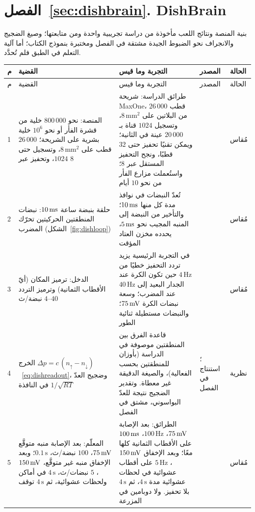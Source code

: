 \section{الفصل~\ref{sec:dishbrain}. \foreignlanguage{english}{DishBrain}}

بنية المنصة ونتائج اللعب مأخوذة من دراسة تجريبية واحدة ومن متابعتها؛ وصيغ الضجيج والانجراف نحو الضبوط الجيدة مشتقة في الفصل ومختبرة بنموذج الكتاب؛ أما آلية التعلم في الطبق فلم تُحدَّد.

{\footnotesize
\setlength{\tabcolsep}{3pt}\renewcommand{\arraystretch}{1.15}
\begin{longtable}{>{\raggedright}p{0.5cm}>{\raggedright}p{4.0cm}>{\raggedright}p{5.6cm}>{\raggedright}p{2.3cm}>{\raggedright\arraybackslash}p{1.7cm}}
\toprule
م & القضية & التجربة وما قيس & المصدر & الحالة \\
\midrule\endfirsthead
\toprule
م & القضية & التجربة وما قيس & المصدر & الحالة \\
\midrule\endhead
1 & المنصة: نحو $800\,000$ خلية من قشرة الفأر أو نحو $10^6$ خلية بشرية على الشريحة؛ $26\,000$ قطب على $8\,\text{mm}^2$، وتسجيل حتى $1024$، وتحفيز عبر $8$ & طرائق الدراسة: شريحة \foreignlanguage{english}{MaxOne}، $26\,000$ قطب من البلاتين على $8\,\text{mm}^2$، وتسجيل $1024$ قناة بـ$20\,000$ عينة في الثانية؛ ويمكن تقنيًا تحفيز حتى $32$ قطبًا، ونجح التحفيز المستقل عبر $8$؛ واستُعملت مزارع الفأر من نحو $10$ أيام & \cite{Kagan2022} & مُقاس \\
2 & حلقة بنبضة ساعة $10\,\text{ms}$: نبضات المنطقتين الحركيتين تحرّك المضرب (الشكل~\ref{fig:dishloop}) & تُعدّ النبضات في نوافذ مدة كل منها $10\,\text{ms}$؛ والتأخير من النبضة إلى المنبه المجيب نحو $5\,\text{ms}$، يحدده مخزن العتاد المؤقت & \cite{Kagan2022} & مُقاس \\
3 & الدخل: ترميز المكان (أيّ الأقطاب الثمانية) وترميز التردد $4\text{--}40$ نبضة/ث & في التجربة الرئيسية يزيد تردد التحفيز خطيًا من $4\,\text{Hz}$ حين تكون الكرة عند الجدار البعيد إلى $40\,\text{Hz}$ عند المضرب؛ وسعة نبضات الكرة $75\,\text{mV}$؛ والنبضات مستطيلة ثنائية الطور & \cite{Kagan2022} & مُقاس \\
4 & الخرج $\Delta p=c\,(n_\uparrow-n_\downarrow)$~\eqref{eq:dishreadout}، وضجيج العدّ في النافذة $1/\sqrt{RT}$ & قاعدة الفرق بين المنطقتين موصوفة في الدراسة (بأوزان للمنطقتين بحسب الفعالية)، والصيغة الدقيقة غير معطاة. وتقدير الضجيج نتيجة للعدّ البواسوني، مشتق في الفصل & \cite{Kagan2022}؛ استنتاج في الفصل & نظرية \\
5 & المعلّم: بعد الإصابة منبه متوقَّع $75\,\text{mV}$، $100$ نبضة/ث، $0.1\,\text{s}$؛ وبعد الإخفاق منبه غير متوقَّع، $150\,\text{mV}$، $5$ نبضات/ث، $4\,\text{s}$ في أماكن ولحظات عشوائية، ثم $4\,\text{s}$ توقف & الطرائق: بعد الإصابة $75\,\text{mV}$، $100\,\text{Hz}$، $100\,\text{ms}$ على الأقطاب الثمانية كلها معًا؛ وبعد الإخفاق $150\,\text{mV}$، $5\,\text{Hz}$ على أقطاب عشوائية في لحظات عشوائية مدة $4\,\text{s}$، ثم $4\,\text{s}$ بلا تحفيز. ولا دوبامين في المزرعة & \cite{Kagan2022} & مُقاس \\

\end{longtable}}
